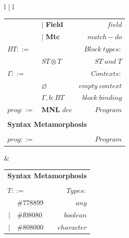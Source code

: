 \documentclass[11pt]{article}
\begin{document}
\begin{figure}[h]
\begin{tabular}[t]{l | l}
\begin{tabular}[t]{l l r}
			                & $|$ \textbf{Field}                        & $field$                     \\
			                & $|$ \textbf{Mtc}                          & $match-do$                  \\
			\; $BT ::=$     &                                           & $Block \; types:$           \\
			                & $ST \otimes T$                            & $ST \; and \; T$            \\
			\; $\Gamma ::=$ &                                           & $Contexts:$                 \\
			                & $\varnothing$                             & $empty \; context$          \\
			                & $\Gamma, b:BT$                            & $block \; binding$          \\
			\; $prog ::=$   & \textbf{MNL} $dec$                        & $Program$                   \\
			                &                                           &                             \\
			\multicolumn{3}{l}{\textbf{Syntax Metamorphosis}}                                         \\
			                &                                           & \framebox{$prog \to block$} \\
			\; $prog ::=$   &                                           & $Program$                   \\
		\end{tabular}
		 &
		\begin{tabular}[t]{r l r}
			\multicolumn{3}{l}{\textbf{Syntax Metamorphosis}}                                                             \\
			                               &                                                  & \framebox{$T \to color$}  \\
			\multicolumn{2}{l}{\;$T ::=$}  & $Types:$                                                                     \\
			                               & \cellcolor [HTML]{778899}\#778899                & $any$                     \\
			$|$                            & \cellcolor [HTML]{f08080}\#f08080                & $boolean$                 \\
			$|$                            & \cellcolor [HTML]{808000}\#808000                & $character$               \\

\end{tabular}
\end{tabular}
\end{figure}
\end{document}
